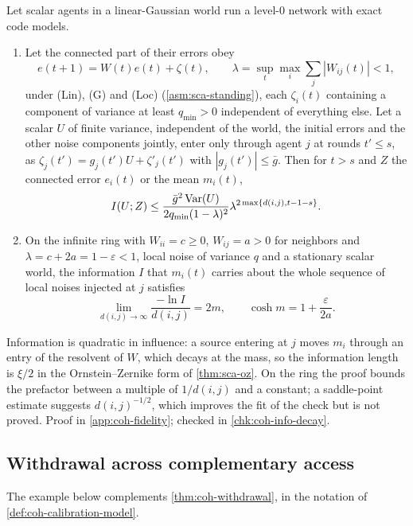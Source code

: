 \begin{proposition}\label{prop:coh-info-decay}
Let scalar agents in a linear-Gaussian world run a level-0 network with exact code models.
\begin{enumerate}\renewcommand{\labelenumi}{(\alph{enumi})}
\item Let the connected part of their errors obey
\[ e(t+1)=W(t)e(t)+\zeta(t),\qquad\lambda=\sup_t\max_i\sum_j|W_{ij}(t)|<1, \]
under \textup{(Lin)}, \textup{(G)} and \textup{(Loc)} (\cref{asm:sca-standing}), each $\zeta_i(t)$ containing a component of variance at least $q_{\min}>0$ independent of everything else. Let a scalar $U$ of finite variance, independent of the world, the initial errors and the other noise components jointly, enter only through agent $j$ at rounds $t'\le s$, as $\zeta_j(t')=g_j(t')U+\zeta'_j(t')$ with $|g_j(t')|\le\bar g$. Then for $t>s$ and $Z$ the connected error $e_i(t)$ or the mean $m_i(t)$,
\[ I(U;Z)\le\frac{\bar g^2\operatorname{Var}(U)}{2q_{\min}(1-\lambda)^2}\lambda^{2\max\{d(i,j),t-1-s\}}. \]
\item On the infinite ring with $W_{ii}=c\ge0$, $W_{ij}=a>0$ for neighbors and $\lambda=c+2a=1-\varepsilon<1$, local noise of variance $q$ and a stationary scalar world, the information $I$ that $m_i(t)$ carries about the whole sequence of local noises injected at $j$ satisfies
\[ \lim_{d(i,j)\to\infty}\frac{-\ln I}{d(i,j)}=2m,\qquad\cosh m=1+\frac{\varepsilon}{2a}. \]
\end{enumerate}
\end{proposition}

Information is quadratic in influence: a source entering at $j$ moves $m_i$ through an entry of the resolvent of $W$, which decays at the mass, so the information length is $\xi/2$ in the Ornstein--Zernike form of \cref{thm:sca-oz}. On the ring the proof bounds the prefactor between a multiple of $1/d(i,j)$ and a constant; a saddle-point estimate suggests $d(i,j)^{-1/2}$, which improves the fit of the check but is not proved. Proof in \cref{app:coh-fidelity}; checked in \cref{chk:coh-info-decay}.

\subsection{Withdrawal across complementary access}\label{sup:coh-withdrawal-across-complementary-access}

The example below complements \cref{thm:coh-withdrawal}, in the notation of \cref{def:coh-calibration-model}.

